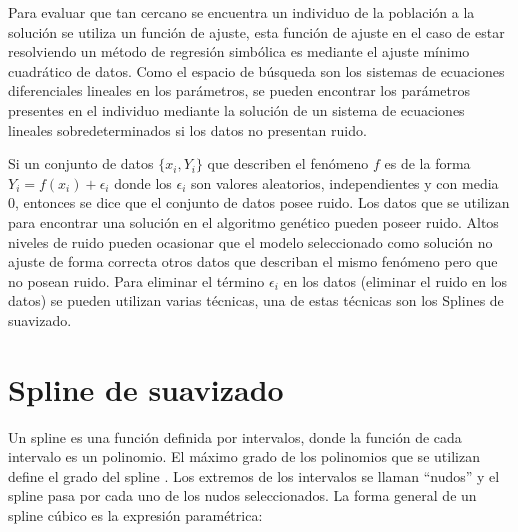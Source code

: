 
Para evaluar que tan cercano se encuentra un individuo de la población a la solución se utiliza un función de ajuste, esta función de ajuste en el caso de estar resolviendo un método de regresión simbólica es mediante el ajuste mínimo cuadrático de datos. Como el espacio de búsqueda son los sistemas de ecuaciones diferenciales lineales en los parámetros, se pueden encontrar los parámetros presentes en el individuo mediante la solución de un sistema de ecuaciones lineales sobredeterminados si los datos no presentan ruido.

Si un conjunto de datos $\{x_i, Y_i\}$ que describen el fenómeno $f$ es de la forma $Y_i = f(x_i) + \epsilon _i$ donde los $\epsilon _i$ son valores aleatorios, independientes y con media 0, entonces se dice que el conjunto de datos posee ruido. Los datos que se utilizan para encontrar una solución en el algoritmo genético pueden poseer ruido. Altos niveles de ruido pueden ocasionar que el modelo seleccionado como solución no ajuste de forma correcta otros datos que describan el mismo fenómeno pero que no posean ruido. Para eliminar el término $\epsilon _i$ en los datos (eliminar el ruido en los datos) se pueden utilizan varias técnicas, una de estas técnicas son los Splines de suavizado.

\section{Spline de suavizado}\label{section:smoothing_splines}

Un spline es una función definida por intervalos, donde la función de cada intervalo es un polinomio. El máximo grado de los polinomios que se utilizan define el grado del spline \cite{ahlberg1967theory}. Los extremos de los intervalos se llaman ``nudos'' y el spline pasa por cada uno de los nudos seleccionados. La forma general de un spline cúbico es la expresión paramétrica:

